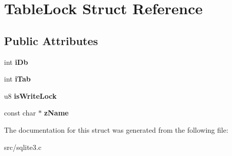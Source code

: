 \hypertarget{struct_table_lock}{\section{Table\-Lock Struct Reference}
\label{struct_table_lock}
}
\subsection*{Public Attributes}
\begin{DoxyCompactItemize}
\item 
\hypertarget{struct_table_lock_ad5cc726ef29ffcca39ec0b72942513f6}{int {\bfseries i\-Db}}\label{struct_table_lock_ad5cc726ef29ffcca39ec0b72942513f6}

\item 
\hypertarget{struct_table_lock_ab25b5d9ba21ed96ed68ce8064ff84e24}{int {\bfseries i\-Tab}}\label{struct_table_lock_ab25b5d9ba21ed96ed68ce8064ff84e24}

\item 
\hypertarget{struct_table_lock_a171121af9886ee08044d4b82b991ceeb}{u8 {\bfseries is\-Write\-Lock}}\label{struct_table_lock_a171121af9886ee08044d4b82b991ceeb}

\item 
\hypertarget{struct_table_lock_ad1ce077fbd2600dd6d23ec08706dd227}{const char $\ast$ {\bfseries z\-Name}}\label{struct_table_lock_ad1ce077fbd2600dd6d23ec08706dd227}

\end{DoxyCompactItemize}


The documentation for this struct was generated from the following file\-:\begin{DoxyCompactItemize}
\item 
src/sqlite3.\-c\end{DoxyCompactItemize}
